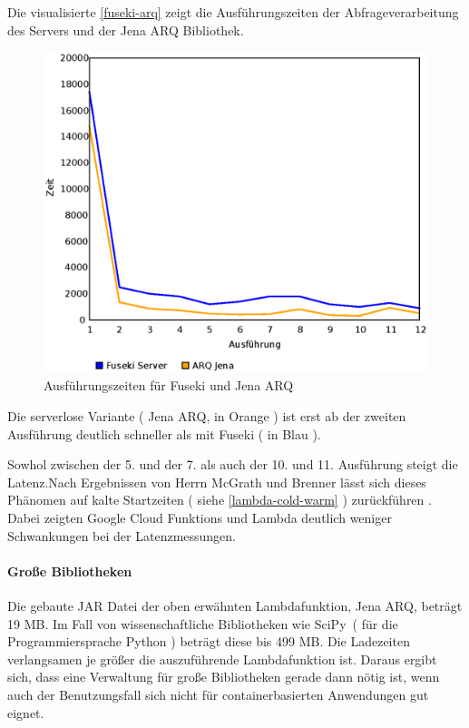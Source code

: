 \documentclass[
12pt,
english,
ngerman,
headsepline,
twoside,
openright,
numbers=noenddot,version=first
]{scrreprt}
\begin{document}
Die visualisierte \autoref{fuseki-arq} zeigt die Ausführungszeiten der Abfrageverarbeitung des Servers und der Jena ARQ Bibliothek. 
\begin{figure}[H]
	\centering{}
	\includegraphics[scale=0.60]{./pics/fuseki-arq.eps}
	\caption{Ausführungszeiten für Fuseki und Jena ARQ }
	\label{fuseki-arq}
\end{figure}

Die serverlose Variante ( Jena ARQ, in Orange ) ist erst ab der zweiten Ausführung deutlich schneller als mit Fuseki ( in Blau ).

Sowhol zwischen der 5. und der 7. als auch der 10. und 11. Ausführung steigt die Latenz.Nach Ergebnissen von Herrn McGrath und Brenner lässt sich dieses Phänomen auf \glqq kalte Startzeiten ( siehe \autoref{lambda-cold-warm} ) zurückführen . Dabei zeigten Google Cloud Funktions und Lambda deutlich weniger Schwankungen bei der Latenzmessungen. \cite{servPerform}

\paragraph{Große Bibliotheken}
Die gebaute JAR Datei der oben erwähnten Lambdafunktion, Jena ARQ, beträgt 19 MB. Im Fall von wissenschaftliche Bibliotheken wie \glqq SciPy\grqq\ ( für die Programmiersprache Python ) beträgt diese bis 499 MB. Die Ladezeiten verlangsamen je größer die auszuführende Lambdafunktion ist. \cite{lambdaBibliothek}
Daraus ergibt sich, dass eine Verwaltung für große Bibliotheken gerade dann nötig ist, wenn auch der Benutzungsfall sich nicht für containerbasierten Anwendungen gut eignet. 
\end{document}
